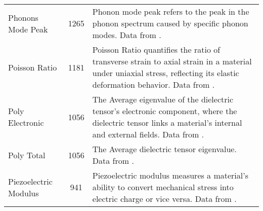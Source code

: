 {\begin{table*}[!ht]
{\begin{tabular}{lcp{11cm}}
        Phonons Mode Peak   & 1265 & Phonon mode peak refers to the peak in the phonon spectrum caused by specific phonon modes. Data from \citet{petretto2018high}.\\
        Poisson Ratio & 1181 & Poisson Ratio quantifies the ratio of transverse strain to axial strain in a material under uniaxial stress, reflecting its elastic deformation behavior. Data from \citet{de2015charting}.\\
        Poly Electronic & 1056 & The Average eigenvalue of the dielectric tensor's electronic component, where the dielectric tensor links a material's internal and external fields. Data from \citet{petousis2017high}.\\
        Poly Total & 1056 & The Average dielectric tensor eigenvalue. Data from \citet{petousis2017high}.\\
        Piezoelectric Modulus & 941  & Piezoelectric modulus measures a material's ability to convert mechanical stress into electric charge or vice versa. Data from \citet{de2015database}.\\
        \bottomrule[1pt]
        \end{tabular}
    }
\label{tab:low-data}
\end{table*}}